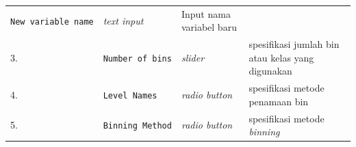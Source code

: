 \documentclass[12pt,]{krantz}
\begin{document}
\begin{longtable}[]{@{}llll@{}}
\begin{minipage}[t]{0.14\columnwidth}
\texttt{New\ variable\ name}\strut
\end{minipage} & \begin{minipage}[t]{0.09\columnwidth}\raggedright
\emph{text input}\strut
\end{minipage} & \begin{minipage}[t]{0.61\columnwidth}\raggedright
Input nama variabel baru\strut
\end{minipage}\tabularnewline
\begin{minipage}[t]{0.04\columnwidth}\raggedright
3.\strut
\end{minipage} & \begin{minipage}[t]{0.14\columnwidth}\raggedright
\texttt{Number\ of\ bins}\strut
\end{minipage} & \begin{minipage}[t]{0.09\columnwidth}\raggedright
\emph{slider}\strut
\end{minipage} & \begin{minipage}[t]{0.61\columnwidth}\raggedright
spesifikasi jumlah bin atau kelas yang digunakan\strut
\end{minipage}\tabularnewline
\begin{minipage}[t]{0.04\columnwidth}\raggedright
4.\strut
\end{minipage} & \begin{minipage}[t]{0.14\columnwidth}\raggedright
\texttt{Level\ Names}\strut
\end{minipage} & \begin{minipage}[t]{0.09\columnwidth}\raggedright
\emph{radio button}\strut
\end{minipage} & \begin{minipage}[t]{0.61\columnwidth}\raggedright
spesifikasi metode penamaan bin\strut
\end{minipage}\tabularnewline
\begin{minipage}[t]{0.04\columnwidth}\raggedright
5.\strut
\end{minipage} & \begin{minipage}[t]{0.14\columnwidth}\raggedright
\texttt{Binning\ Method}\strut
\end{minipage} & \begin{minipage}[t]{0.09\columnwidth}\raggedright
\emph{radio button}\strut
\end{minipage} & \begin{minipage}[t]{0.61\columnwidth}\raggedright
spesifikasi metode \emph{binning}\strut
\end{minipage}\tabularnewline
\bottomrule
\end{longtable}
\end{document}
